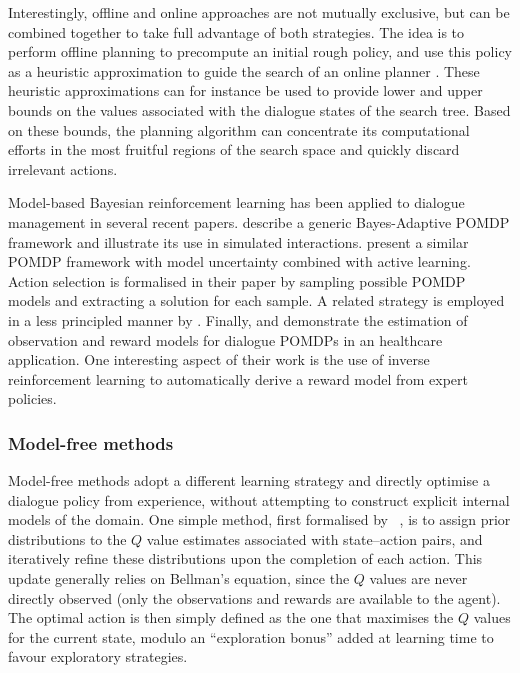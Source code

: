 Interestingly, offline and online approaches are not mutually exclusive, but can be combined together to take full advantage of both strategies.  The idea is to perform offline planning to precompute an initial rough policy, and use this policy as a heuristic approximation to guide the search of an online planner \citep{RossC07}. These heuristic approximations can for instance be used to provide lower and upper bounds on the values associated with the dialogue states of the search tree.  Based on these bounds, the planning algorithm can concentrate its computational efforts in the most fruitful regions of the search space and quickly discard irrelevant actions. 

Model-based Bayesian reinforcement learning has been applied to dialogue management in several recent papers.  \cite{DBLP:journals/jstsp/PngPC12} describe a generic Bayes-Adaptive POMDP framework and illustrate its use in simulated interactions. \cite{DoshiR08} present a similar POMDP framework with model uncertainty combined with active learning.  Action selection is formalised in their paper by sampling possible POMDP models and extracting a solution for each sample. A related strategy is employed in a less principled manner by \cite{DBLP:conf/iui/AtrashP09}.  Finally, \cite{ChinaeiC12} and \cite{chinaei2012} demonstrate the estimation of observation and reward models for dialogue POMDPs in an healthcare application.  One interesting aspect of their work is the use of inverse reinforcement learning to automatically derive a reward model from expert policies.

\subsubsection*{Model-free methods}

Model-free methods adopt a different learning strategy and directly optimise a dialogue policy from experience, without attempting to construct explicit internal models of the domain. One simple method, first formalised by \ \cite{Dearden:1998}, is to assign prior distributions to the $Q$ value estimates associated with state--action pairs, and iteratively refine these distributions upon the completion of each action. This update generally relies on Bellman's equation, since the $Q$ values are never directly observed (only the observations and rewards are available to the agent). The optimal action is then simply defined as the one that maximises the $Q$ values for the current state, modulo an ``exploration bonus'' added at learning time to favour exploratory strategies.  

